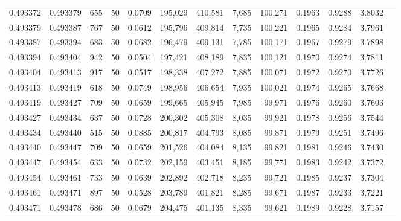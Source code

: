 \begin{tabular}{rrrrrrrrrrrrr}
0.493372 & 0.493379 &   655 &  50 &                                     0.0709 & 195,029 & 410,581 &   7,685 & 100,271 & 0.1963 & 0.9288 & 3.8032 \\
0.493379 & 0.493387 &   767 &  50 &                                     0.0612 & 195,796 & 409,814 &   7,735 & 100,221 & 0.1965 & 0.9284 & 3.7961 \\
0.493387 & 0.493394 &   683 &  50 &                                     0.0682 & 196,479 & 409,131 &   7,785 & 100,171 & 0.1967 & 0.9279 & 3.7898 \\
0.493394 & 0.493404 &   942 &  50 &                                     0.0504 & 197,421 & 408,189 &   7,835 & 100,121 & 0.1970 & 0.9274 & 3.7811 \\
0.493404 & 0.493413 &   917 &  50 &                                     0.0517 & 198,338 & 407,272 &   7,885 & 100,071 & 0.1972 & 0.9270 & 3.7726 \\
0.493413 & 0.493419 &   618 &  50 &                                     0.0749 & 198,956 & 406,654 &   7,935 & 100,021 & 0.1974 & 0.9265 & 3.7668 \\
0.493419 & 0.493427 &   709 &  50 &                                     0.0659 & 199,665 & 405,945 &   7,985 &  99,971 & 0.1976 & 0.9260 & 3.7603 \\
0.493427 & 0.493434 &   637 &  50 &                                     0.0728 & 200,302 & 405,308 &   8,035 &  99,921 & 0.1978 & 0.9256 & 3.7544 \\
0.493434 & 0.493440 &   515 &  50 &                                     0.0885 & 200,817 & 404,793 &   8,085 &  99,871 & 0.1979 & 0.9251 & 3.7496 \\
0.493440 & 0.493447 &   709 &  50 &                                     0.0659 & 201,526 & 404,084 &   8,135 &  99,821 & 0.1981 & 0.9246 & 3.7430 \\
0.493447 & 0.493454 &   633 &  50 &                                     0.0732 & 202,159 & 403,451 &   8,185 &  99,771 & 0.1983 & 0.9242 & 3.7372 \\
0.493454 & 0.493461 &   733 &  50 &                                     0.0639 & 202,892 & 402,718 &   8,235 &  99,721 & 0.1985 & 0.9237 & 3.7304 \\
0.493461 & 0.493471 &   897 &  50 &                                     0.0528 & 203,789 & 401,821 &   8,285 &  99,671 & 0.1987 & 0.9233 & 3.7221 \\
0.493471 & 0.493478 &   686 &  50 &                                     0.0679 & 204,475 & 401,135 &   8,335 &  99,621 & 0.1989 & 0.9228 & 3.7157 \\

\end{tabular}
